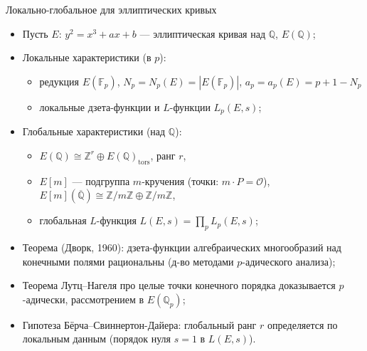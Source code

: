 \documentclass[serif, aspectratio=169]{beamer}
\newcommand{\sagemark}{%
  \textcolor{green!40!black}{\textbf{\texttt{sage:...}}}%
}
\begin{document}
\begin{frame}{Локально-глобальное для эллиптических кривых}
    \begin{itemize}
        \item Пусть $E$: $y^2=x^3+ax+b$ --- эллиптическая кривая над $\mathbb{Q}$, $E(\mathbb{Q})$;
        \item Локальные характеристики (в $p$):
        \begin{itemize}
            \item редукция $E(\mathbb{F}_p)$, $N_p=N_p(E)=|E(\mathbb{F}_p)|$, $a_p=a_p(E)=p+1-N_p$
            \item локальные дзета-функции и $L$-функции $L_p(E,s)$;
        \end{itemize}
        \item Глобальные характеристики (над $\mathbb{Q}$):
        \begin{itemize}
            \item $E(\mathbb{Q})\cong\mathbb{Z}^r\oplus E(\mathbb{Q})_{\mathrm{tors}}$, ранг $r$,
            \item $E[m]$ --- подгруппа $m$-кручения (точки: $m\cdot P=\mathcal{O}$), $E[m](\overline{\mathbb{Q}})\cong\mathbb{Z}/m\mathbb{Z}\oplus\mathbb{Z}/m\mathbb{Z}$,
            \item глобальная $L$-функция $L(E,s)=\prod_p L_p(E,s)$;
        \end{itemize}
        \item Теорема (Дворк, 1960): дзета-функции алгебраических многообразий над конечными полями рациональны (д-во методами $p$-адического анализа);
        \item Теорема Лутц--Нагеля про целые точки конечного порядка доказывается $p$-адически, рассмотрением в $E(\mathbb{Q}_p)$;
        \item Гипотеза Бёрча--Свиннертон-Дайера: глобальный ранг $r$ определяется по локальным данным (порядок нуля $s=1$ в $L(E,s)$).
    \end{itemize}
    

\end{frame}
\end{document}
